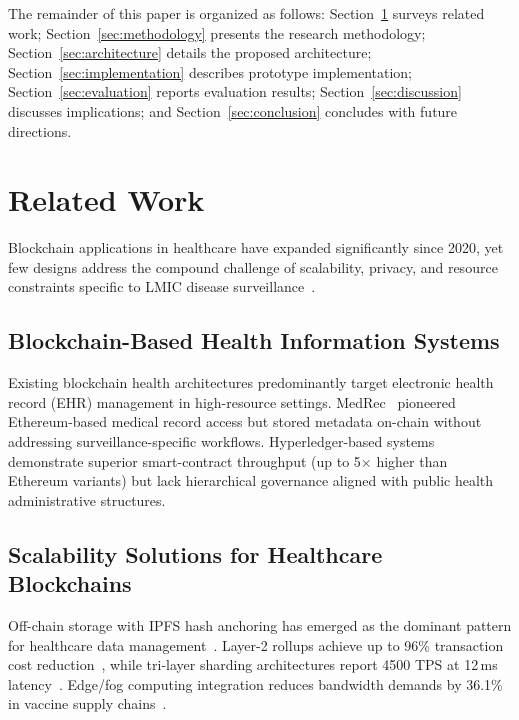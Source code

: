 \documentclass[AMA,LATO1COL]{WileyNJDv5}
\begin{document}
The remainder of this paper is organized as follows: Section~\ref{sec:related} surveys related work; Section~\ref{sec:methodology} presents the research methodology; Section~\ref{sec:architecture} details the proposed architecture; Section~\ref{sec:implementation} describes prototype implementation; Section~\ref{sec:evaluation} reports evaluation results; Section~\ref{sec:discussion} discusses implications; and Section~\ref{sec:conclusion} concludes with future directions.

\section{Related Work}\label{sec:related}

Blockchain applications in healthcare have expanded significantly since 2020, yet few designs address the compound challenge of scalability, privacy, and resource constraints specific to LMIC disease surveillance~\cite{Li2025,Mazhar2025}.

\subsection{Blockchain-Based Health Information Systems}

Existing blockchain health architectures predominantly target electronic health record (EHR) management in high-resource settings. MedRec~\cite{Azaria2016} pioneered Ethereum-based medical record access but stored metadata on-chain without addressing surveillance-specific workflows. Hyperledger-based systems~\cite{Khan2025} demonstrate superior smart-contract throughput (up to 5$\times$ higher than Ethereum variants) but lack hierarchical governance aligned with public health administrative structures.

\subsection{Scalability Solutions for Healthcare Blockchains}

Off-chain storage with IPFS hash anchoring has emerged as the dominant pattern for healthcare data management~\cite{Maher2024,Nandanwar2025,Kumar2025}. Layer-2 rollups achieve up to 96\% transaction cost reduction~\cite{Raghav2026}, while tri-layer sharding architectures report 4500 TPS at 12\,ms latency~\cite{Maithili2025}. Edge/fog computing integration reduces bandwidth demands by 36.1\% in vaccine supply chains~\cite{Akter2025,Saha2025}.
\end{document}
